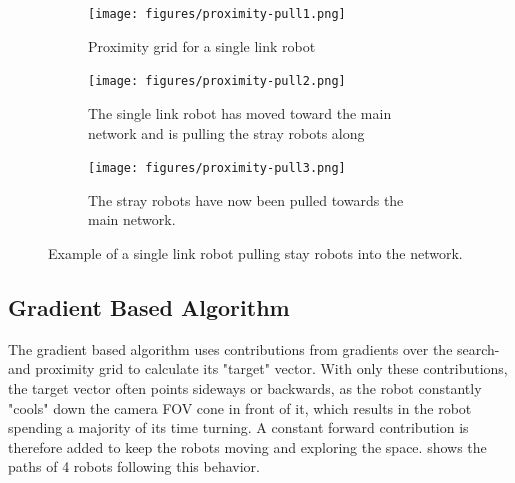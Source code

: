 \def\w{0.329\textwidth}
\begin{figure}[h]
    \begin{center}
        \begin{subfigure}[b]{\w}
            \centering
            \texttt{[image: figures/proximity-pull1.png]}
            \caption{Proximity grid for a {\color{red} single link} robot}
            \label{fig:proximity-pull1}
        \end{subfigure}
        \begin{subfigure}[b]{\w}
            \centering
            \texttt{[image: figures/proximity-pull2.png]}
            \caption{The single link robot has moved toward the main network and is pulling the stray robots along}
            \label{fig:proximity-pull2}
        \end{subfigure}
        \begin{subfigure}[b]{\w}
            \centering
            \texttt{[image: figures/proximity-pull3.png]}
            \caption{The stray robots have now been pulled towards the main network.}
            \label{fig:proximity-pull3}
        \end{subfigure}
    \end{center}
    \caption{Example of a {\color{red} single link} robot pulling stay robots into the network.}\label{fig:proximity-pull}
\end{figure}


\subsection{Gradient Based Algorithm}
The gradient based algorithm uses contributions from gradients over the search{\color{red}-} and proximity grid to calculate its "target" vector. With only these contributions, the target vector often points sideways or backwards, as the robot constantly "cools" down the camera FOV cone in front of it, which results in the robot spending a majority of its time turning. A constant forward contribution is therefore added to keep the robots moving and exploring the space.  shows the paths of 4 robots following this behavior.

